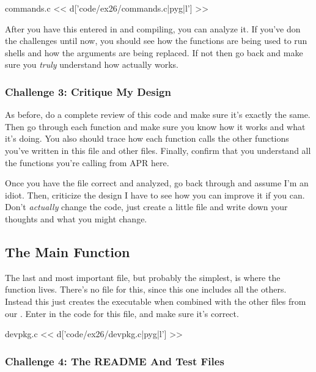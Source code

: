 \begin{code}{commands.c}
<< d['code/ex26/commands.c|pyg|l'] >>
\end{code}

After you have this entered in and compiling, you can analyze it.  If you've
don the challenges until now, you should see how the  functions
are being used to run shells and how the arguments are being replaced.  If
not then go back and make sure you \emph{truly} understand how 
actually works.

\subsubsection{Challenge 3: Critique My Design}

As before, do a complete review of this code and make sure it's exactly
the same.  Then go through each function and make sure you know how it 
works and what it's doing.  You also should trace how each function calls
the other functions you've written in this file and other files.  Finally,
confirm that you understand all the functions you're calling from APR here.

Once you have the file correct and analyzed, go back through and assume
I'm an idiot.  Then, criticize the design I have to see how you can improve
it if you can.  Don't \emph{actually} change the code, just create a little
 file and write down your thoughts and what you might change.


\subsection{The  Main Function}

The last and most important file, but probably the simplest, is 
where the  function lives.  There's no  file for this, since
this one includes all the others.  Instead this just creates the executable
 when combined with the other  files from our 
.  Enter in the code for this file, and make sure it's 
correct.

\begin{code}{devpkg.c}
<< d['code/ex26/devpkg.c|pyg|l'] >>
\end{code}

\subsubsection{Challenge 4: The README And Test Files}

